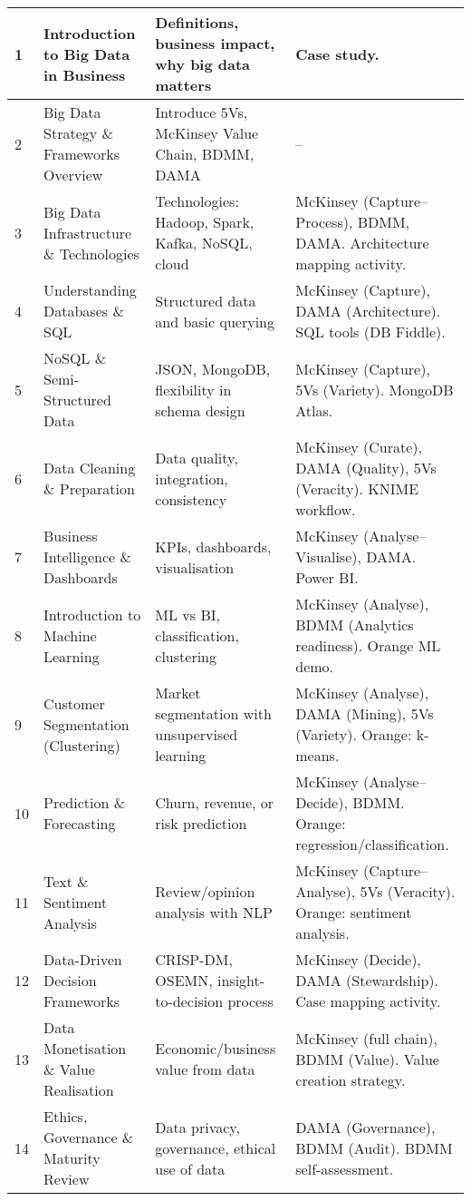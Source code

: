 \begin{longtable}{|p{}|p{}|p{}|p{}|}
	1 & Introduction to Big Data in Business & Definitions, business impact, why big data matters & Case study. \\
	\hline
	2 & Big Data Strategy \& Frameworks Overview & Introduce 5Vs, McKinsey Value Chain, BDMM, DAMA & -- \\
	\hline
	3 & Big Data Infrastructure \& Technologies & Technologies: Hadoop, Spark, Kafka, NoSQL, cloud & McKinsey (Capture–Process), BDMM, DAMA. Architecture mapping activity. \\
	\hline
	4 & Understanding Databases \& SQL & Structured data and basic querying & McKinsey (Capture), DAMA (Architecture). SQL tools (DB Fiddle). \\
	\hline
	5 & NoSQL \& Semi-Structured Data & JSON, MongoDB, flexibility in schema design & McKinsey (Capture), 5Vs (Variety). MongoDB Atlas. \\
	\hline
	6 & Data Cleaning \& Preparation & Data quality, integration, consistency & McKinsey (Curate), DAMA (Quality), 5Vs (Veracity). KNIME workflow. \\
	\hline
	7 & Business Intelligence \& Dashboards & KPIs, dashboards, visualisation & McKinsey (Analyse–Visualise), DAMA. Power BI. \\
	\hline
	8 & Introduction to Machine Learning & ML vs BI, classification, clustering & McKinsey (Analyse), BDMM (Analytics readiness). Orange ML demo. \\
	\hline
	9 & Customer Segmentation (Clustering) & Market segmentation with unsupervised learning & McKinsey (Analyse), DAMA (Mining), 5Vs (Variety). Orange: k-means. \\
	\hline
	10 & Prediction \& Forecasting & Churn, revenue, or risk prediction & McKinsey (Analyse–Decide), BDMM. Orange: regression/classification. \\
	\hline
	11 & Text \& Sentiment Analysis & Review/opinion analysis with NLP & McKinsey (Capture–Analyse), 5Vs (Veracity). Orange: sentiment analysis. \\
	\hline
	12 & Data-Driven Decision Frameworks & CRISP-DM, OSEMN, insight-to-decision process & McKinsey (Decide), DAMA (Stewardship). Case mapping activity. \\
	\hline
	13 & Data Monetisation \& Value Realisation & Economic/business value from data & McKinsey (full chain), BDMM (Value). Value creation strategy. \\
	\hline
	14 & Ethics, Governance \& Maturity Review & Data privacy, governance, ethical use of data & DAMA (Governance), BDMM (Audit). BDMM self-assessment. \\
	\hline
	
\end{longtable}



